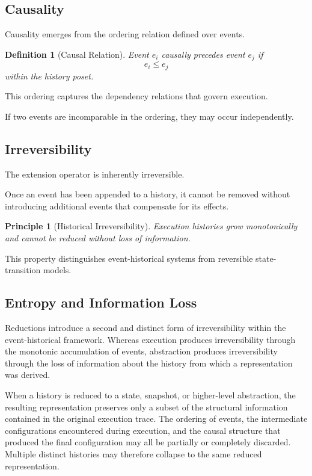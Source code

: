 \documentclass[12pt]{article}
\newtheorem{definition}{Definition}
\newtheorem{principle}{Principle}
\begin{document}
\subsection{Causality}

Causality emerges from the ordering relation
defined over events.

\begin{definition}[Causal Relation]
Event $e_i$ causally precedes event $e_j$ if
\[
e_i \leq e_j
\]
within the history poset.
\end{definition}

This ordering captures the dependency relations
that govern execution.

If two events are incomparable in the ordering,
they may occur independently.

\subsection{Irreversibility}

The extension operator is inherently irreversible.

Once an event has been appended to a history,
it cannot be removed without introducing additional
events that compensate for its effects.

\begin{principle}[Historical Irreversibility]
Execution histories grow monotonically and cannot
be reduced without loss of information.
\end{principle}

This property distinguishes event-historical systems
from reversible state-transition models.

\subsection{Entropy and Information Loss}

Reductions introduce a second and distinct form of irreversibility
within the event-historical framework. Whereas execution produces
irreversibility through the monotonic accumulation of events,
abstraction produces irreversibility through the loss of
information about the history from which a representation was
derived.

When a history is reduced to a state, snapshot, or higher-level
abstraction, the resulting representation preserves only a
subset of the structural information contained in the original
execution trace. The ordering of events, the intermediate
configurations encountered during execution, and the causal
structure that produced the final configuration may all be
partially or completely discarded. Multiple distinct histories
may therefore collapse to the same reduced representation.
\end{document}
